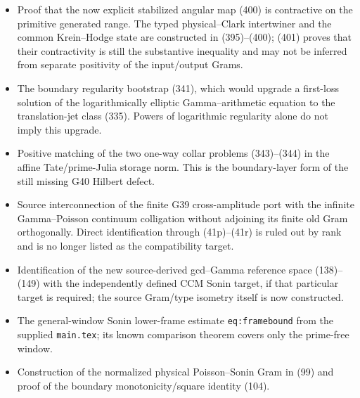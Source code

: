 \documentclass[11pt]{article}
\begin{document}
\begin{itemize}
      removal of the two Tate evaluation directions.  Boundary
      unimodularity is proved, but a Schur/inner or generalized-inner class
      with the required primitive index has not been established.
      Equivalently, prove that the positive stored delay (383), together with
      the two moving Tate terminal energies (109), dominates the negative
      winding-corrected prime delays (378) on $\mathcal P_T$.
      The realization cannot be a scalar half-plane inner factor by (384);
      it must use the oppositely oriented Bayes Euler and Gamma ports already
      constructed in (214)--(220j).
\item Proof that the now explicit stabilized angular map (400) is
      contractive on the primitive generated range.  The typed
      physical--Clark intertwiner and the common Krein--Hodge state are
      constructed in (395)--(400); (401) proves that their contractivity is
      still the substantive inequality and may not be inferred from separate
      positivity of the input/output Grams.
\item The boundary regularity bootstrap (341), which would upgrade a
      first-loss solution of the logarithmically elliptic Gamma--arithmetic
      equation to the translation-jet class (335).  Powers of logarithmic
      regularity alone do not imply this upgrade.
\item Positive matching of the two one-way collar problems (343)--(344) in
      the affine Tate/prime-Julia storage norm.  This is the boundary-layer
      form of the still missing G40 Hilbert defect.
\item Source interconnection of the finite G39 cross-amplitude port with the
      infinite Gamma--Poisson continuum colligation without adjoining its
      finite old Gram orthogonally.  Direct identification through
      (41p)--(41r) is ruled out by rank and is no longer listed as the
      compatibility target.
\item Identification of the new source-derived gcd--Gamma reference space
      (138)--(149) with the independently defined CCM Sonin target, if that
      particular target is required; the source Gram/type isometry itself is
      now constructed.
\item The general-window Sonin lower-frame estimate
      \texttt{eq:framebound} from the supplied \texttt{main.tex}; its known
      comparison theorem covers only the prime-free window.
\item Construction of the normalized physical Poisson--Sonin Gram in (99)
      and proof of the boundary monotonicity/square identity (104).

\end{itemize}
\end{document}
